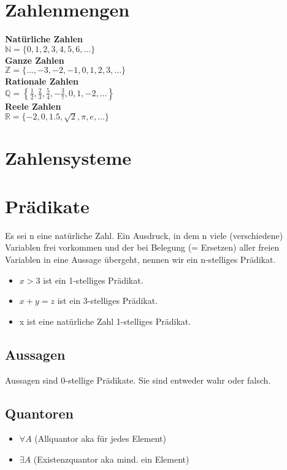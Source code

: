 \section{Zahlenmengen}
{\bf Natürliche Zahlen}\\
\(\mathbb{N} = \{0,1,2,3,4,5,6,...\}\) \\
{\bf Ganze Zahlen}\\
\(\mathbb{Z} = \{...,-3,-2,-1,0,1,2,3,...\}\) \\
{\bf Rationale Zahlen}\\
\(\mathbb{Q} = \left\{ \frac{1}{2}, \frac{2}{3}, \frac{5}{4}, -\frac{3}{7}, 0, 1, -2, ... \right\}\) \\
{\bf Reele Zahlen}\\
\(\mathbb{R} = \{ -2, 0, 1.5, \sqrt{2}, \pi, e, ... \}\)

\section{Zahlensysteme}

\section{Prädikate}
Es sei n eine natürliche Zahl. Ein Ausdruck, in dem n viele
(verschiedene) Variablen frei vorkommen und der bei Belegung (=
Ersetzen) aller freien Variablen in eine Aussage übergeht, nennen wir
ein n-stelliges Prädikat.
\begin{itemize}
    \item $x > 3$ ist ein 1-stelliges Prädikat.
    \item $x + y = z$ ist ein 3-stelliges Prädikat.
    \item x ist eine natürliche Zahl 1-stelliges Prädikat.
\end{itemize}
\subsection{Aussagen}
Aussagen sind 0-stellige Prädikate. Sie sind entweder wahr oder falsch.
\subsection{Quantoren}
\begin{itemize}
    \item \(\forall A\) (Allquantor aka für jedes Element)
    \item \(\exists A\) (Existenzquantor aka mind. ein Element)
\end{itemize}
